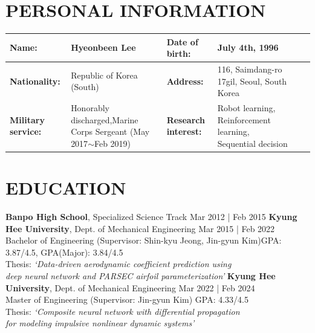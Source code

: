 \documentclass[a4paper,10pt]{extarticle}
\begin{document}
\renewcommand*{\arraystretch}{1.5}
\noindent
\section*{PERSONAL INFORMATION}
\begin{center}
    \vspace*{-0.8cm}
    \noindent
    \begin{longtable}{LRLRLR}
        \textbf{Name:}             & Hyeonbeen Lee                                                                           & \textbf{Date of birth:}     & July 4th, 1996                                              \\
        \hline
        \textbf{Nationality:}      & Republic of Korea (South)                                                               & \textbf{Address:}           & 116, Saimdang-ro 17gil, Seoul, South Korea                  \\
        \hline
        \textbf{Military service:} & Honorably discharged,\linebreak Marine Corps Sergeant {\small (May 2017$\sim$Feb 2019)} & \textbf{Research interest:} & Robot learning, Reinforcement learning, Sequential decision \\
        \hline
    \end{longtable}
\end{center}

\section*{EDUCATION}
\noindent
\textbf{Banpo High School}, Specialized Science Track \hfill Mar 2012 | Feb 2015
\newline
\textbf{Kyung Hee University}, Dept. of Mechanical Engineering \hfill Mar 2015 | Feb 2022\\ %
Bachelor of Engineering (Supervisor: Shin-kyu Jeong, Jin-gyun Kim)\hfill GPA: 3.87/4.5, GPA(Major): 3.84/4.5\\ %
Thesis: \textit{{\small `Data-driven aerodynamic coefficient prediction using}}\\
\hspace*{1.3cm}\textit{{\small deep neural
            network and PARSEC airfoil parameterization'}}
\newline
\textbf{Kyung Hee University}, Dept. of Mechanical Engineering \hfill Mar 2022 | Feb 2024\\ %
Master of Engineering (Supervisor: Jin-gyun Kim) \hfill GPA: 4.33/4.5\\ %
Thesis: \textit{{\small `Composite neural network with differential propagation}}\\
\hspace*{1.3cm}\textit{\small{for modeling impulsive nonlinear dynamic systems'}}
\end{document}
